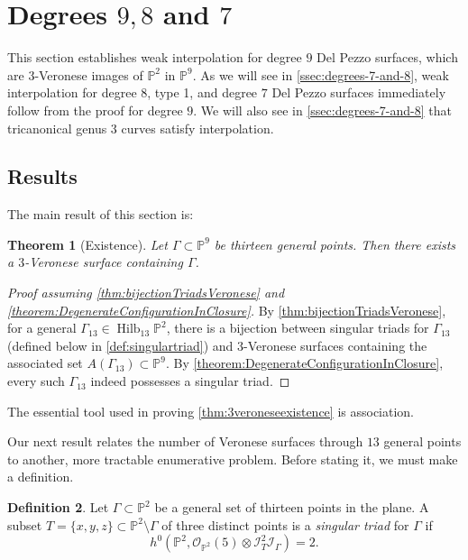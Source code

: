 \documentclass[reqno, 11pt]{amsart}
\theoremstyle{definition}
\theoremstyle{remark}
\numberwithin{equation}{section}
\numberwithin{thm}{section}
\numberwithin{prop}{section}
\numberwithin{lem}{section}
\numberwithin{cor}{section}
\numberwithin{conj}{section}
\numberwithin{defn}{section}
\theoremstyle{plain}
\newtheorem{theorem}{Theorem}[section]
\theoremstyle{definition}
\newtheorem{definition}[theorem]{Definition}
\newcommand\bp{{\mathbb P}}
\newcommand\so{{\mathscr O}}
\newcommand\sci{\mathscr I}
\DeclareMathOperator\Hilb{Hilb}
\begin{document}
\section{Degrees $9,8$ and $7$}
\label{sec:degree-7-8-9}
This section establishes weak interpolation for degree $9$ Del Pezzo surfaces, which are $3$-Veronese images of $\bp^{2}$ in $\bp^{9}$.  As we will see
in \autoref{ssec:degrees-7-and-8},
weak interpolation for degree $8$, type 1, and degree $7$ Del Pezzo surfaces immediately follow from the proof for degree $9$. We will also see in
\autoref{ssec:degrees-7-and-8} that tricanonical genus $3$ curves satisfy
interpolation.

\subsection{Results}
The main result of this section is:

\begin{theorem}[Existence]\label{thm:3veroneseexistence}
Let $\Gamma \subset \bp^{9}$ be thirteen general points. Then there exists a $3$-Veronese surface  containing $\Gamma$.
\end{theorem}
\begin{proof}[Proof assuming \autoref{thm:bijectionTriadsVeronese} and \autoref{theorem:DegenerateConfigurationInClosure}]
	By \autoref{thm:bijectionTriadsVeronese}, for a general
	$\Gamma_{13} \in \Hilb_{13} \bp^2$, there is a bijection
	between singular triads for $\Gamma_{13}$ (defined below in \autoref{def:singulartriad})
	and $3$-Veronese surfaces containing the associated set $A(\Gamma_{13}) \subset \bp^{9}$. 
	By \autoref{theorem:DegenerateConfigurationInClosure},
	every such $\Gamma_{13}$ indeed possesses a singular triad.
\end{proof}

The essential tool used in proving \autoref{thm:3veroneseexistence} is association. 

Our next result relates the number of Veronese surfaces through $13$ general points to another, more tractable  enumerative problem.  Before stating it, we must make a definition. 

\begin{definition}\label{def:singulartriad}
Let $\Gamma \subset \bp^2$ be a general set of thirteen points in the plane. A subset $T = \{x,y,z\} \subset \bp^2 \setminus \Gamma$ of three distinct points is a {\sl singular triad} for $\Gamma$ if \[h^{0}(\bp^{2}, \so_{\bp^{2}}(5)\otimes \sci_{T}^{2}\sci_{\Gamma}) = 2.\]
\end{definition}
\end{document}
